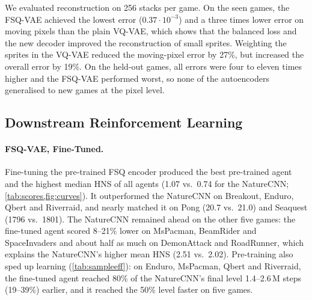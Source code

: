 \documentclass[runningheads]{llncs}
\begin{document}
We evaluated reconstruction on 256 stacks per game. On the seen games,
the FSQ-VAE achieved the lowest error ($0.37\cdot10^{-3}$) and a three times lower error on
moving pixels than the plain VQ-VAE, which shows that the balanced loss and the new decoder
improved the reconstruction of small sprites. Weighting the sprites in the VQ-VAE reduced the
moving-pixel error by 27\%, but increased the overall error by 19\%. On the held-out games, all
errors were four to eleven times higher and the FSQ-VAE performed worst, so none of the
autoencoders generalised to new games at the pixel level.

\FloatBarrier
\subsection{Downstream Reinforcement Learning}
\label{sec:rl}

\paragraph{FSQ-VAE, Fine-Tuned.} Fine-tuning the pre-trained FSQ encoder produced the best
pre-trained agent and the highest median HNS of all agents (1.07 vs.\ 0.74 for the NatureCNN;
\cref{tab:scores,fig:curves}). It outperformed the NatureCNN on Breakout, Enduro, Qbert and
Riverraid, and nearly matched it on Pong (20.7 vs.\ 21.0) and Seaquest (1796 vs.\ 1801). The
NatureCNN remained ahead on the other five games: the fine-tuned agent scored 8--21\% lower on
MsPacman, BeamRider and SpaceInvaders and about half as much on DemonAttack and RoadRunner,
which explains the NatureCNN's higher mean HNS (2.51 vs.\ 2.02). Pre-training also sped up learning (\cref{tab:sampleeff}): on
Enduro, MsPacman, Qbert and Riverraid, the fine-tuned agent reached 80\% of the NatureCNN's
final level 1.4--2.6\,M steps (19--39\%) earlier, and it reached the 50\% level faster on five
games.

\begin{table}[!htbp]
\centering
\caption{Mean episode return over the last 10\% of 10\,M training steps (single seed); best
per game in bold. $^\dagger$\,held-out games, not used for pre-training. Std-VAE and Res-VQ
scores, and NatureCNN and V-JEPA scores on the held-out games, are rounded as recorded. V-JEPA with the flattened feature; the pooled variant is in
\cref{tab:jepa-abl}.}
\label{tab:scores}
\footnotesize\setlength{\tabcolsep}{3pt}
\end{table}
\end{document}
